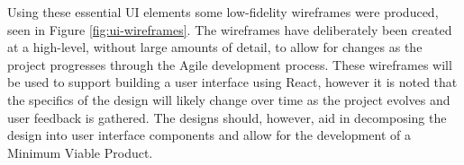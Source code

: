 Using these essential UI elements some low-fidelity wireframes were produced, seen in Figure \ref{fig:ui-wireframes}. The wireframes have deliberately been created at a high-level, without large amounts of detail, to allow for changes as the project progresses through the Agile development process. These wireframes will be used to support building a user interface using React, however it is noted that the specifics of the design will likely change over time as the project evolves and user feedback is gathered. The designs should, however, aid in decomposing the design into user interface components and allow for the development of a Minimum Viable Product.